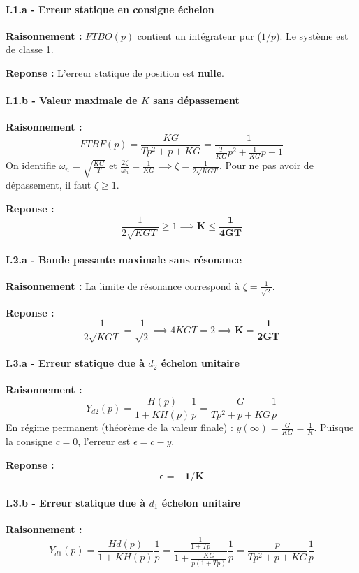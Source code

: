 \documentclass[11pt,a4paper]{article}
\begin{document}
\paragraph{I.1.a - Erreur statique en consigne échelon}
\textbf{Raisonnement :} $FTBO(p)$ contient un intégrateur pur ($1/p$). Le système est de classe 1.

\textbf{Reponse :} L'erreur statique de position est \textbf{nulle}.

\paragraph{I.1.b - Valeur maximale de $K$ sans dépassement}
\textbf{Raisonnement :} 
$$ FTBF(p) = \frac{KG}{Tp^2+p+KG} = \frac{1}{\frac{T}{KG}p^2 + \frac{1}{KG}p + 1} $$
On identifie $\omega_n = \sqrt{\frac{KG}{T}}$ et $\frac{2\zeta}{\omega_n} = \frac{1}{KG} \implies \zeta = \frac{1}{2\sqrt{KGT}}$.
Pour ne pas avoir de dépassement, il faut $\zeta \ge 1$.

\textbf{Reponse :} 
$$ \frac{1}{2\sqrt{KGT}} \ge 1 \implies \mathbf{K \le \frac{1}{4GT}} $$

\paragraph{I.2.a - Bande passante maximale sans résonance}
\textbf{Raisonnement :} La limite de résonance correspond à $\zeta = \frac{1}{\sqrt{2}}$.

\textbf{Reponse :} 
$$ \frac{1}{2\sqrt{KGT}} = \frac{1}{\sqrt{2}} \implies 4KGT = 2 \implies \mathbf{K = \frac{1}{2GT}} $$

\paragraph{I.3.a - Erreur statique due à $d_2$ échelon unitaire}
\textbf{Raisonnement :} 
$$ Y_{d2}(p) = \frac{H(p)}{1+KH(p)} \frac{1}{p} = \frac{G}{Tp^2+p+KG} \frac{1}{p} $$
En régime permanent (théorème de la valeur finale) : $y(\infty) = \frac{G}{KG} = \frac{1}{K}$.
Puisque la consigne $c=0$, l'erreur est $\epsilon = c - y$.

\textbf{Reponse :} 
$$ \mathbf{\epsilon = -1/K} $$

\paragraph{I.3.b - Erreur statique due à $d_1$ échelon unitaire}
\textbf{Raisonnement :} 
$$ Y_{d1}(p) = \frac{Hd(p)}{1+KH(p)} \frac{1}{p} = \frac{\frac{1}{1+Tp}}{1+\frac{KG}{p(1+Tp)}} \frac{1}{p} = \frac{p}{Tp^2+p+KG} \frac{1}{p} $$
\end{document}
